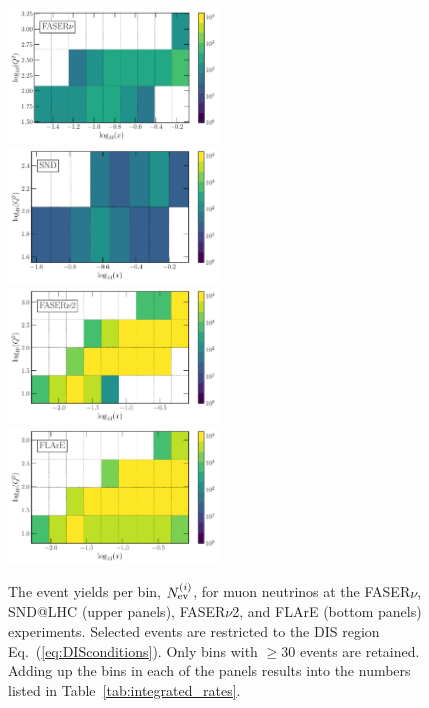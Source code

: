 \begin{figure}[t]
    \centering
    \includegraphics[width=0.495\textwidth]{plots/FPF-FASERv.pdf}
    \includegraphics[width=0.495\textwidth]{plots/FPF-SND.pdf}
    \includegraphics[width=0.495\textwidth]{plots/FPF-FASERv2.pdf}
    \includegraphics[width=0.495\textwidth]{plots/FPF-FLArE100.pdf}
    \caption{\small The event yields per bin, $N_{\rm ev}^{(i)}$, for muon neutrinos at the
      FASER$\nu$, SND@LHC (upper panels), FASER$\nu$2, and FLArE (bottom panels) experiments.
      Selected events are restricted to the DIS region Eq.~(\ref{eq:DISconditions}).
      Only bins with $\ge 30$ events are retained.
	Adding up the bins in each of the panels results into the numbers listed in
	Table~\ref{tab:integrated_rates}.}
    \label{fig:fasernu2_muon}
\end{figure}

